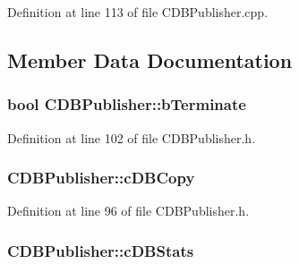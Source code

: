 \-Definition at line 113 of file \-C\-D\-B\-Publisher.\-cpp.



\subsection{\-Member \-Data \-Documentation}
\hypertarget{class_c_d_b_publisher_a067f21d227664a36fcccfba89a03b89c}{
\subsubsection[{b\-Terminate}]{\setlength{\rightskip}{0pt plus 5cm}bool {\bf \-C\-D\-B\-Publisher\-::b\-Terminate}}}\label{class_c_d_b_publisher_a067f21d227664a36fcccfba89a03b89c}


\-Definition at line 102 of file \-C\-D\-B\-Publisher.\-h.

\hypertarget{class_c_d_b_publisher_a3a63670d4729d713995f05fd4a83a2ba}{
\subsubsection[{c\-D\-B\-Copy}]{ {\bf \-C\-D\-B\-Publisher\-::c\-D\-B\-Copy}}}\label{class_c_d_b_publisher_a3a63670d4729d713995f05fd4a83a2ba}


\-Definition at line 96 of file \-C\-D\-B\-Publisher.\-h.

\hypertarget{class_c_d_b_publisher_a6b1709641e8a184c32ce1776547c43ca}{
\subsubsection[{c\-D\-B\-Stats}]{ {\bf \-C\-D\-B\-Publisher\-::c\-D\-B\-Stats}}}\label{class_c_d_b_publisher_a6b1709641e8a184c32ce1776547c43ca}


